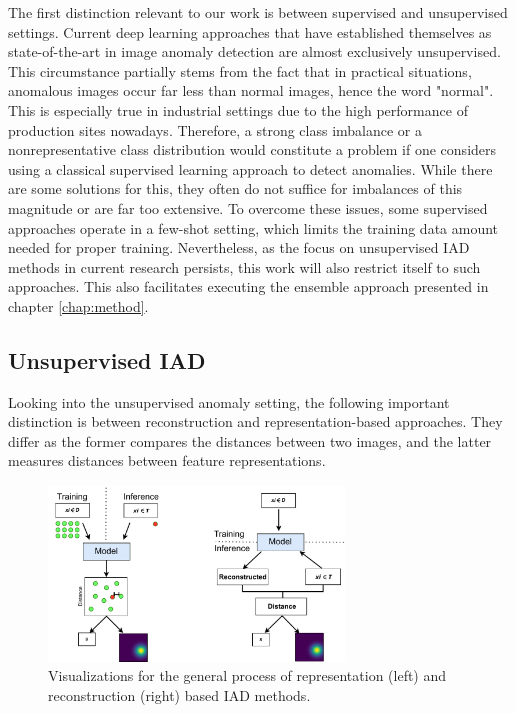 The first distinction relevant to our work is between supervised and unsupervised settings. Current deep learning approaches that have established themselves as state-of-the-art in image anomaly detection 
are almost exclusively unsupervised. This circumstance partially stems from the fact 
that in practical situations, anomalous images occur far less than normal images, hence the word "normal". This is especially true in industrial settings due to the high performance of 
production sites nowadays. Therefore, a strong class imbalance or a nonrepresentative class 
distribution would constitute a problem if one considers using a classical supervised learning approach to detect anomalies. While there are some solutions for this, they often do not suffice for imbalances of this magnitude or are far too extensive. To overcome 
these issues, some supervised approaches \cite{Chu_2020supervised} operate in a few-shot setting, which limits the training data amount needed for proper training. Nevertheless, as the focus on 
unsupervised IAD methods in current research persists, 
this work will also restrict itself to such approaches. This also facilitates executing the ensemble approach presented in chapter \ref{chap:method}.
\newline
\subsection{Unsupervised IAD} 
Looking into the unsupervised anomaly setting, the following important distinction is between reconstruction and representation-based approaches. They differ as the
 former compares the distances between two images, and the latter measures distances between feature representations.

\begin{figure}[H]
    \centering
    \includegraphics[width=0.7\textwidth]{figures/recvsreppdf.pdf}
    \caption{Visualizations for the general process of representation (left) and reconstruction (right) based IAD methods.}
    \label{fig:recvsrep}
\end{figure}


